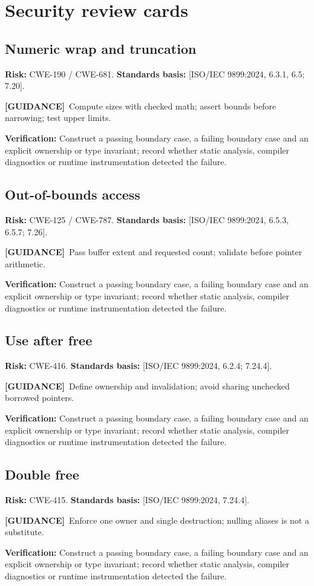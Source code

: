 \documentclass[10pt,letterpaper,oneside]{report}
\newcommand{\refcl}[1]{\textsf{\footnotesize[ISO/IEC 9899:2024, #1]}}
\newcommand{\guidance}{\textbf{[GUIDANCE]}}
\begin{document}
\chapter{Security review cards}
\section{Numeric wrap and truncation}
\textbf{Risk:} CWE-190 / CWE-681. \textbf{Standards basis:} \refcl{6.3.1, 6.5; 7.20}.\par\guidance\ Compute sizes with checked math; assert bounds before narrowing; test upper limits.\par\textbf{Verification:} Construct a passing boundary case, a failing boundary case and an explicit ownership or type invariant; record whether static analysis, compiler diagnostics or runtime instrumentation detected the failure.
\section{Out-of-bounds access}
\textbf{Risk:} CWE-125 / CWE-787. \textbf{Standards basis:} \refcl{6.5.3, 6.5.7; 7.26}.\par\guidance\ Pass buffer extent and requested count; validate before pointer arithmetic.\par\textbf{Verification:} Construct a passing boundary case, a failing boundary case and an explicit ownership or type invariant; record whether static analysis, compiler diagnostics or runtime instrumentation detected the failure.
\section{Use after free}
\textbf{Risk:} CWE-416. \textbf{Standards basis:} \refcl{6.2.4; 7.24.4}.\par\guidance\ Define ownership and invalidation; avoid sharing unchecked borrowed pointers.\par\textbf{Verification:} Construct a passing boundary case, a failing boundary case and an explicit ownership or type invariant; record whether static analysis, compiler diagnostics or runtime instrumentation detected the failure.
\section{Double free}
\textbf{Risk:} CWE-415. \textbf{Standards basis:} \refcl{7.24.4}.\par\guidance\ Enforce one owner and single destruction; nulling aliases is not a substitute.\par\textbf{Verification:} Construct a passing boundary case, a failing boundary case and an explicit ownership or type invariant; record whether static analysis, compiler diagnostics or runtime instrumentation detected the failure.
\end{document}
